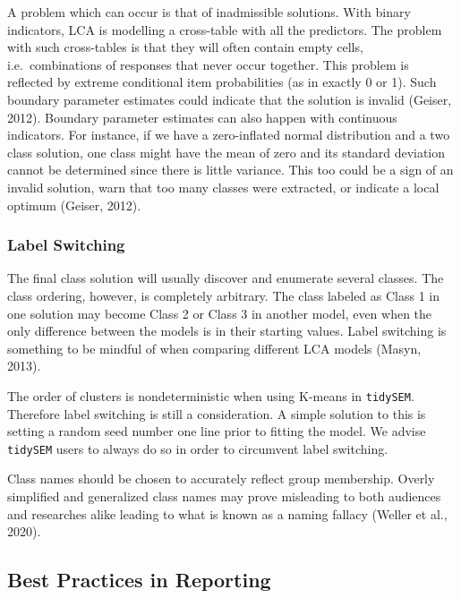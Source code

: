 \documentclass[
  ,man,floatsintext]{apa6}
\begin{document}
A problem which can occur is that of inadmissible solutions.
With binary indicators, LCA is modelling a cross-table with all the predictors.
The problem with such cross-tables is that they will often contain empty cells,
i.e.~combinations of responses that never occur together.
This problem is reflected by extreme conditional item probabilities (as in exactly 0 or 1).
Such boundary parameter estimates could indicate that the solution is invalid (Geiser, 2012).
Boundary parameter estimates can also happen with continuous indicators.
For instance, if we have a zero-inflated normal distribution and a two class solution,
one class might have the mean of zero and its standard deviation cannot be determined
since there is little variance.
This too could be a sign of an invalid solution,
warn that too many classes were extracted, or indicate a local optimum (Geiser, 2012).

\hypertarget{label-switching}{%
\subsubsection{Label Switching}\label{label-switching}}

The final class solution will usually discover and enumerate several classes.
The class ordering, however, is completely arbitrary.
The class labeled as Class 1 in one solution
may become Class 2 or Class 3 in another model,
even when the only difference between the models is in their starting values.
Label switching is something to be mindful of when comparing different LCA models (Masyn, 2013).

The order of clusters is nondeterministic when using K-means in \texttt{tidySEM}.
Therefore label switching is still a consideration.
A simple solution to this is setting a random seed number one line prior to fitting the model.
We advise \texttt{tidySEM} users to always do so in order to circumvent label switching.

Class names should be chosen to accurately reflect group membership.
Overly simplified and generalized class names may prove misleading
to both audiences and researches alike
leading to what is known as a naming fallacy (Weller et al., 2020).

\hypertarget{best-practices-in-reporting}{%
\subsection{Best Practices in Reporting}\label{best-practices-in-reporting}}
\end{document}
